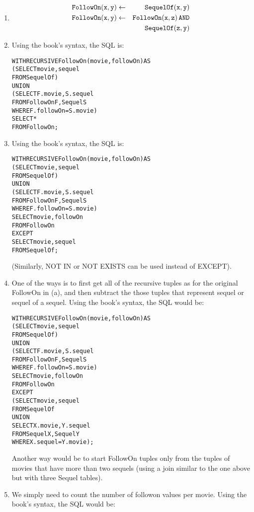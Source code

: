 \begin{enumerate}
\item
\begin{eqnarray*}
\tt FollowOn(x,y) &\leftarrow& \tt SequelOf(x,y) \\
\tt FollowOn(x,y) &\leftarrow& \tt FollowOn(x,z)\, AND \\
& & \tt SequelOf(z,y)
\end{eqnarray*}
\item
Using the book's syntax, the SQL is:\newline
\begin{alltt}
WITH RECURSIVE FollowOn(movie, followOn) AS
  (SELECT movie, sequel
   FROM   SequelOf     )
  UNION
  (SELECT F.movie, S.sequel
   FROM   FollowOn F, Sequel S
   WHERE  F.followOn = S.movie)
SELECT *
FROM   FollowOn;
\end{alltt}
\item
Using the book's syntax, the SQL is:\newline
\begin{alltt}
WITH RECURSIVE FollowOn(movie, followOn) AS
  (SELECT movie, sequel
   FROM   SequelOf     )
  UNION
  (SELECT F.movie, S.sequel
   FROM   FollowOn F, Sequel S
   WHERE  F.followOn = S.movie)
SELECT movie, followOn
FROM   FollowOn
EXCEPT
SELECT movie, sequel
FROM   SequelOf;
\end{alltt}
(Similarly, NOT IN or NOT EXISTS can be used instead of EXCEPT).
\item
One of the ways is to first get all of the recursive tuples as for the
original FollowOn in (a), and then subtract the those tuples that
represent sequel or sequel of a sequel. Using the book's syntax, the SQL
would be:\newline
\begin{alltt}
WITH RECURSIVE FollowOn(movie, followOn) AS
  (SELECT movie, sequel
   FROM   SequelOf     )
  UNION
  (SELECT F.movie, S.sequel
   FROM   FollowOn F, Sequel S
   WHERE  F.followOn = S.movie)
SELECT movie, followOn
FROM   FollowOn
EXCEPT
(SELECT movie, sequel
 FROM   SequelOf
 UNION
 SELECT X.movie, Y.sequel
 FROM   Sequel X, Sequel Y
 WHERE  X.sequel = Y.movie);
\end{alltt}
Another way would be to start FollowOn tuples only from the tuples
of movies that have more than two sequels (using a join similar to the
one above but with three Sequel tables).
\item
We simply need to count the number of followon values per movie.
Using the book's syntax, the SQL
would be:\newline

\end{enumerate}
